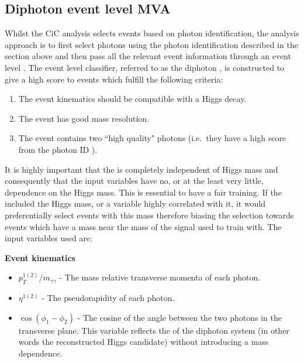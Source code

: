 \subsection{Diphoton event level \acs{MVA}}
\label{sec:diphoton_bdt}

Whilst the CiC analysis selects events based on photon identification, the \MVA analysis approach is to first select photons using the photon identification \BDT described in the section above and then pass all the relevant event information through an event level \BDT. The event level classifier, referred to as the diphoton \BDT, is constructed to give a high score to events which fulfill the following criteria:

\begin{enumerate}
  \item The event kinematics should be compatible with a Higgs decay.
  \item The event has good mass resolution.
  \item The event contains two ``high quality" photons (i.e.~they have a high score from the photon ID \BDT).
\end{enumerate}

It is highly important that the \BDT is completely independent of Higgs mass and consequently that the input variables have no, or at the least very little, dependence on the Higgs mass. This is essential to have a fair training. If the \BDT included the Higgs mass, or a variable highly correlated with it, it would preferentially select events with this mass therefore biasing the selection towards events which have a mass near the mass of the signal used to train with. The input variables used are:

\noindent\textbf{Event kinematics}
\begin{itemize}
  \item $p_{T}^{1(2)}/m_{\gamma\gamma}$ - The mass relative transverse momenta of each photon.
  \item $\eta^{1(2)}$ - The pseudorapidity of each photon.
  \item $\cos(\phi_{1}-\phi_{2})$ - The cosine of the angle between the two photons in the transverse plane. This variable reflects the \pT of the diphoton system (in other words the reconstructed Higgs candidate) without introducing a mass dependence.
\end{itemize}

